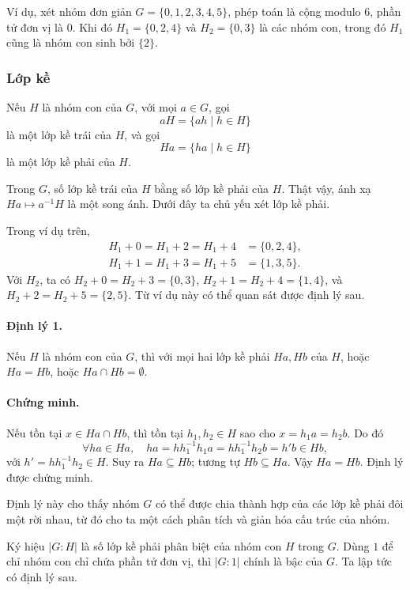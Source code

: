 \documentclass[11pt]{article}
\begin{document}
Ví dụ, xét nhóm đơn giản \(G=\{0,1,2,3,4,5\}\), phép toán là cộng modulo \(6\),
phần tử đơn vị là \(0\). Khi đó \(H_1=\{0,2,4\}\) và \(H_2=\{0,3\}\) là các
nhóm con, trong đó \(H_1\) cũng là nhóm con sinh bởi \(\{2\}\).

\subsubsection{Lớp kề}

Nếu \(H\) là nhóm con của \(G\), với mọi \(a\in G\), gọi
\[
  aH=\{ah\mid h\in H\}
\]
là một lớp kề trái của \(H\), và gọi
\[
  Ha=\{ha\mid h\in H\}
\]
là một lớp kề phải của \(H\).

Trong \(G\), số lớp kề trái của \(H\) bằng số lớp kề phải của \(H\). Thật vậy,
ánh xạ \(Ha\mapsto a^{-1}H\) là một song ánh. Dưới đây ta chủ yếu xét lớp kề
phải.

Trong ví dụ trên,
\[
\begin{aligned}
H_1+0=H_1+2=H_1+4&=\{0,2,4\},\\
H_1+1=H_1+3=H_1+5&=\{1,3,5\}.
\end{aligned}
\]
Với \(H_2\), ta có \(H_2+0=H_2+3=\{0,3\}\),
\(H_2+1=H_2+4=\{1,4\}\), và \(H_2+2=H_2+5=\{2,5\}\). Từ ví dụ này có thể quan
sát được định lý sau.

\paragraph{Định lý 1.}
Nếu \(H\) là nhóm con của \(G\), thì với mọi hai lớp kề phải \(Ha,Hb\) của
\(H\), hoặc \(Ha=Hb\), hoặc \(Ha\cap Hb=\emptyset\).

\paragraph{Chứng minh.}
Nếu tồn tại \(x\in Ha\cap Hb\), thì tồn tại \(h_1,h_2\in H\) sao cho
\(x=h_1a=h_2b\). Do đó
\[
  \forall ha\in Ha,\quad
  ha=hh_1^{-1}h_1a=hh_1^{-1}h_2b=h'b\in Hb,
\]
với \(h'=hh_1^{-1}h_2\in H\). Suy ra \(Ha\subseteq Hb\); tương tự
\(Hb\subseteq Ha\). Vậy \(Ha=Hb\). Định lý được chứng minh.

Định lý này cho thấy nhóm \(G\) có thể được chia thành hợp của các lớp kề phải
đôi một rời nhau, từ đó cho ta một cách phân tích và giản hóa cấu trúc của nhóm.

Ký hiệu \(|G:H|\) là số lớp kề phải phân biệt của nhóm con \(H\) trong \(G\).
Dùng \(1\) để chỉ nhóm con chỉ chứa phần tử đơn vị, thì \(|G:1|\) chính là bậc
của \(G\). Ta lập tức có định lý sau.
\end{document}
